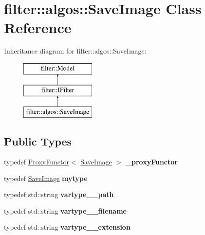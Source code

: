\hypertarget{classfilter_1_1algos_1_1_save_image}{}\section{filter\+:\+:algos\+:\+:Save\+Image Class Reference}
\label{classfilter_1_1algos_1_1_save_image}
Inheritance diagram for filter\+:\+:algos\+:\+:Save\+Image\+:\begin{figure}[H]
\begin{center}
\leavevmode
\includegraphics[height=3.000000cm]{de/db2/classfilter_1_1algos_1_1_save_image}
\end{center}
\end{figure}
\subsection*{Public Types}
\begin{DoxyCompactItemize}
\item 
\mbox{\label{classfilter_1_1algos_1_1_save_image_a2de87bd7e416bf2bc2c48fb2310a7fca}} 
typedef \hyperlink{class_proxy_functor}{Proxy\+Functor}$<$ \hyperlink{classfilter_1_1algos_1_1_save_image}{Save\+Image} $>$ {\bfseries \+\_\+proxy\+Functor}
\item 
\mbox{\label{classfilter_1_1algos_1_1_save_image_a7a0e2a0280f1e058e3886692b9bfe690}} 
typedef \hyperlink{classfilter_1_1algos_1_1_save_image}{Save\+Image} {\bfseries mytype}
\item 
\mbox{\label{classfilter_1_1algos_1_1_save_image_ac2fb34aec00b6d81eb4c73fe2d8dea70}} 
typedef std\+::string {\bfseries vartype\+\_\+\+\_\+path}
\item 
\mbox{\label{classfilter_1_1algos_1_1_save_image_a047b5b39d951d81576af2e3f932c0498}} 
typedef std\+::string {\bfseries vartype\+\_\+\+\_\+filename}
\item 
\mbox{\label{classfilter_1_1algos_1_1_save_image_a76159fa58378dccbbc60673076718c17}} 
typedef std\+::string {\bfseries vartype\+\_\+\+\_\+extension}
\end{DoxyCompactItemize}
